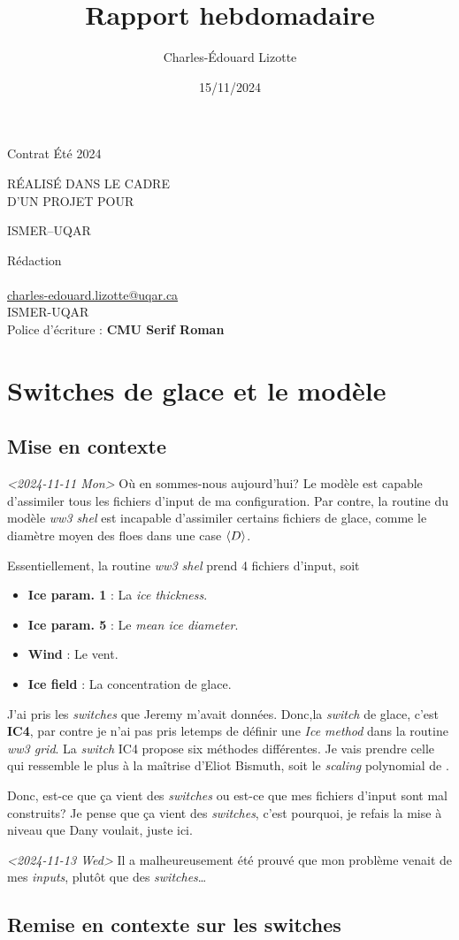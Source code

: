 \documentclass[10pt]{article}
\author{Charles-Édouard Lizotte}
\date{15/11/2024}
\title{Rapport hebdomadaire}
\makeatletter
\numberwithin{equation}{section}
\newcommand{\mytitlepage}{
\begin{titlepage}
\begin{center}
{\Huge \thesubtitle \par}
\vspace{2cm}
{\Huge \MakeUppercase{\thetitle} \par}
\vspace{2cm}
RÉALISÉ DANS LE CADRE\\ D'UN PROJET POUR \par
\vspace{2cm}
{\Huge ISMER--UQAR \par}
\vspace{2cm}
{\thedate}
\end{center}
\vfill
Rédaction \\
{\theauthor}\\
\url{charles-edouard.lizotte@uqar.ca}\\
ISMER-UQAR\\
Police d'écriture : \textbf{CMU Serif Roman}
\end{titlepage}
}
\newcommand{\thesubtitle}{Contrat Été 2024}
\makeatother
\begin{document}
\mytitlepage
\tableofcontents\newpage
\section{Switches de glace et le modèle}
\label{sec:org5d88e57}

\subsection{Mise en contexte}
\label{sec:orga5903e4}

\textit{<2024-11-11 Mon> } Où en sommes-nous aujourd'hui? Le modèle est capable d'assimiler tous les fichiers d'input de ma configuration. Par contre, la routine du modèle \emph{ww3 shel} est incapable d'assimiler certains fichiers de glace, comme le diamètre moyen des floes dans une case \(\expval{D}\).\bigskip

Essentiellement, la routine \emph{ww3 shel} prend 4 fichiers d'input, soit
\begin{itemize}
\item \textbf{Ice param. 1} : La \emph{ice thickness}.
\item \textbf{Ice param. 5} : Le \emph{mean ice diameter}.
\item \textbf{Wind} : Le vent.
\item \textbf{Ice field} : La concentration de glace.
\end{itemize}

J'ai pris les \emph{switches} que Jeremy m'avait données. Donc,la \emph{switch} de glace, c'est \textbf{IC4}, par contre je n'ai pas pris letemps de définir une \emph{Ice method} dans la routine \emph{ww3 grid}. La \emph{switch} IC4 propose six méthodes différentes. Je vais prendre celle qui ressemble le plus à la maîtrise d'Eliot Bismuth, soit le \emph{scaling} polynomial de \Textcite{kohout2008elastic}.\bigskip

Donc, est-ce que ça vient des \emph{switches} ou est-ce que mes fichiers d'input sont mal construits? Je pense que ça vient des \emph{switches}, c'est pourquoi, je refais la mise à niveau que Dany voulait, juste ici. \medskip

\textit{<2024-11-13 Wed> } Il a malheureusement été prouvé que mon problème venait de mes \emph{inputs}, plutôt que des \emph{switches}\ldots{}
\subsection{Remise en contexte sur les switches}
\label{sec:org5d0b280}
\end{document}
